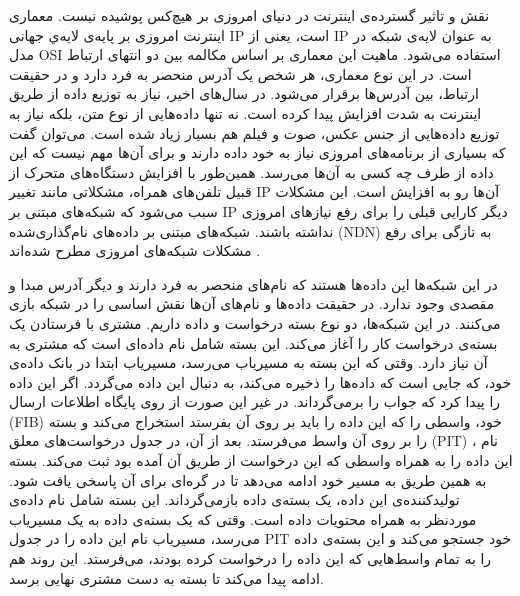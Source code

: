 

نقش و تاثیر گسترده‌ی اینترنت در دنیای امروزی بر هیچ‌کس پوشیده نیست. معماری اینترنت امروزی بر پایه‌ی لایه‌ي جهانی IP است، یعنی از IP به عنوان لایه‌ی شبکه در مدل OSI  استفاده می‌شود. ماهیت این معماری بر اساس مکالمه بین دو انتهای ارتباط است. در این نوع معماری، هر شخص یک آدرس منحصر به فرد دارد و در حقیقت ارتباط، بین آدرس‌ها برقرار می‌شود. 
در سال‌های اخیر، نیاز به توزیع داده‌ از طریق اینترنت به شدت افزایش پیدا کرده است. نه تنها داده‌هایی از نوع متن، بلکه نیاز به توزیع داده‌هایی از جنس عکس، صوت و فیلم هم بسیار زیاد شده است. می‌توان گفت که بسیاری از برنامه‌های امروزی نیاز به خود داده دارند و برای آن‌ها مهم نیست که این داده از طرف چه کسی به آن‌ها می‌رسد. همین‌طور با افزایش دستگاه‌های متحرک از قبیل تلفن‌های همراه، مشکلاتی مانند تغییر IP آن‌ها رو به افزایش است. این مشکلات سبب می‌شود که شبکه‌‌های مبتنی بر IP دیگر کارایی قبلی را برای رفع نیازهای امروزی نداشته باشند. شبکه‌های مبتنی بر داده‌‌های نام‌گذاری‌شده
(NDN)
 به تازگی برای رفع مشکلات شبکه‌های امروزی مطرح شده‌اند
\cite{ndn}.

در این شبکه‌ها این داده‌ها هستند که نام‌های منحصر به فرد دارند و دیگر آدرس مبدا و مقصدی وجود ندارد. در حقیقت داده‌ها و نام‌‌های آن‌ها نقش اساسی را در شبکه بازی می‌کنند. در این شبکه‌ها، دو نوع بسته درخواست و داده داریم. مشتری با فرستادن یک بسته‌ی درخواست کار را آغاز می‌کند. این بسته شامل نام داده‌ای است که مشتری به آن نیاز دارد. وقتی که این بسته به مسیریاب می‌رسد، مسیریاب ابتدا در بانک داده‌ی خود، که جایی است که داده‌ها را ذخیره می‌کند، به دنبال این داده می‌گردد. اگر این داده را پیدا کرد که جواب را برمی‌گرداند. در غیر این صورت از روی پایگاه اطلاعات ارسال (FIB) خود، واسطی را که این داده را باید بر روی آن بفرستد استخراج می‌کند و بسته را بر روی آن واسط می‌فرستد. بعد از آن، در جدول درخواست‌های معلق (PIT) ، نام این داده را به همراه واسطی که این درخواست از طریق آن آمده بود ثبت می‌کند. بسته به همین‌ طریق به مسیر خود ادامه می‌دهد تا در گره‌ای برای آن پاسخی یافت شود. تولیدکننده‌ی این داده، یک بسته‌ی داده بازمی‌گرداند. این بسته شامل نام داده‌‌ی موردنظر به همراه محتویات داده است. وقتی که یک بسته‌ی داده به یک مسیریاب می‌رسد، مسیریاب نام این داده را در جدول PIT خود جستجو می‌کند و این بسته‌ی داده را به تمام واسط‌هایی که این داده را درخواست کرده بودند، می‌فرستد. این روند هم ادامه پیدا می‌کند تا بسته به دست مشتری نهایی برسد. 
 
